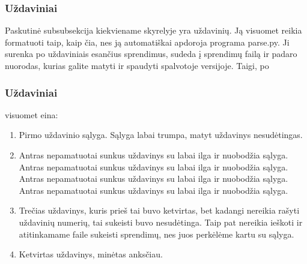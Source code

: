 \subsubsection{Uždaviniai}

Paskutinė subsubsekcija kiekviename skyrelyje yra uždavinių. Ją visuomet reikia
formatuoti taip, kaip čia, nes ją automatiškai apdoroja programa parse.py. Ji
surenka po uždaviniais esančius sprendimus, sudeda į sprendimų failą ir padaro
nuorodas, kurias galite matyti ir spaudyti spalvotoje versijoje. Taigi, po
\subsubsection{Uždaviniai} visuomet eina:

\begin{enumerate}
\item Pirmo uždavinio sąlyga. Sąlyga labai trumpa, matyt uždavinys nesudėtingas.
\item Antras nepamatuotai sunkus uždavinys su labai ilga ir nuobodžia sąlyga.
Antras nepamatuotai sunkus uždavinys su labai ilga ir nuobodžia sąlyga. Antras
nepamatuotai sunkus uždavinys su labai ilga ir nuobodžia sąlyga. Antras
nepamatuotai sunkus uždavinys su labai ilga ir nuobodžia sąlyga.
\item Trečias uždavinys, kuris prieš tai buvo ketvirtas, bet kadangi nereikia
rašyti uždavinių numerių, tai sukeisti buvo nesudėtinga. Taip pat nereikia
ieškoti ir atitinkamame faile sukeisti sprendimų, nes juos perkėlėme kartu su
sąlyga.
\item Ketvirtas uždavinys, minėtas anksčiau.
\end{enumerate}
